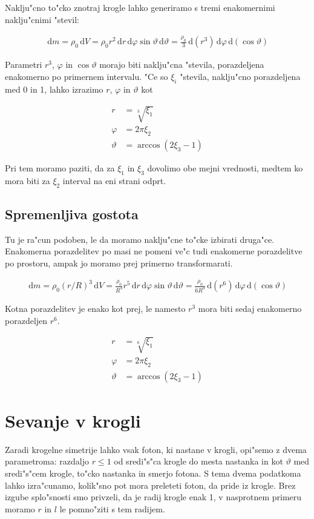 \documentclass[a4paper,10pt]{article}
\renewcommand{\theta}{\vartheta}
\renewcommand{\phi}{\varphi}
\newcommand{\dd}{\,\mathrm{d}}
\begin{document}
Naklju"cno to"cko znotraj krogle lahko generiramo s tremi enakomernimi naklju"cnimi "stevil:

\begin{align}
 \dd m = \rho_0 \dd V = \rho_0 r^2 \dd r \dd \phi \sin\theta \dd \theta = \frac{\rho_0}{3} \dd(r^3) \dd\phi \dd(\cos\theta)
\end{align}

Parametri $r^3$, $\phi$ in $\cos\theta$ morajo biti naklju"cna "stevila, porazdeljena enakomerno po primernem intervalu. "Ce so $\xi_i$ "stevila, naklju"cno porazdeljena med 0 in 1, lahko izrazimo $r$, $\phi$ in $\theta$ kot

\begin{align}
 r &= \sqrt[3]{\xi_1} \\
 \phi &= 2\pi\xi_2 \\
 \theta &= \arccos (2\xi_3 - 1)
\end{align}

Pri tem moramo paziti, da za $\xi_1$ in $\xi_3$ dovolimo obe mejni vrednosti, medtem ko mora biti za $\xi_2$ interval na eni strani odprt. 

\subsection{Spremenljiva gostota}
Tu je ra"cun podoben, le da moramo naklju"cne to"cke izbirati druga"ce. Enakomerna porazdelitev po masi ne pomeni ve"c tudi enakomerne porazdelitve po prostoru, ampak jo moramo prej primerno transformarati. 

\begin{align}
 \dd m = \rho_0 (r/R)^3 \dd V = \frac{\rho_0}{R^3} r^5 \dd r \dd \phi \sin\theta \dd \theta = \frac{\rho_0}{6R^3} \dd(r^6) \dd\phi \dd(\cos\theta)
\end{align}

Kotna porazdelitev je enako kot prej, le namesto $r^3$ mora biti sedaj enakomerno porazdeljen $r^6$. 

\begin{align}
 r &= \sqrt[6]{\xi_1} \\
 \phi &= 2\pi\xi_2 \\
 \theta &= \arccos (2\xi_3 - 1)
\end{align}


\section{Sevanje v krogli}

Zaradi krogelne simetrije lahko vsak foton, ki nastane v krogli, opi"semo z dvema parametroma: razdaljo $r\leq1$ od sredi"s"ca krogle do mesta nastanka in kot $\theta$ med sredi"s"cem krogle, to"cko nastanka in smerjo fotona. S tema dvema podatkoma lahko izra"cunamo, kolik"sno pot mora preleteti foton, da pride iz krogle. Brez izgube splo"snosti smo privzeli, da je radij krogle enak 1, v nasprotnem primeru moramo $r$ in $l$ le pomno"ziti s tem radijem. 
\end{document}
